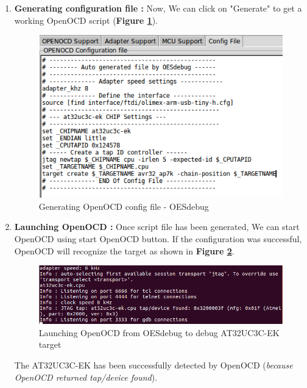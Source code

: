 \begin{enumerate}
\begin{enumerate}
		\item \textbf{Generating configuration file : } Now, We can click on "Generate" to get a working OpenOCD script (\textbf{Figure \ref{Generating OpenOCD config file - OESdebug}}).
		\begin{figure}[H]
			\centering
        	\includegraphics[scale=0.55]{img/solution/OESdebug-generatedScript.png}
        	\caption{Generating OpenOCD config file - OESdebug}
        	\label{Generating OpenOCD config file - OESdebug}
    	\end{figure}		
		
		
		\item \textbf{Launching OpenOCD : } Once script file has been generated, We can start OpenOCD using start OpenOCD button. If the configuration was successful, OpenOCD will recognize the target as shown in \textbf{Figure \ref{Launching OpenOCD from OESdebug on AT32UC3C-EK target}}.		
		\begin{figure}[H]
			\centering
        	\includegraphics[scale=0.60]{img/solution/at32uc3c0512c-found-openocd.png}
        	\caption{Launching OpenOCD from OESdebug to debug AT32UC3C-EK target}
        	\label{Launching OpenOCD from OESdebug on AT32UC3C-EK target}
    	\end{figure}	
	
		The AT32UC3C-EK has been successfully detected by OpenOCD (\textit{because OpenOCD returned \textit{tap/device found}}).
		

\end{enumerate}
\end{enumerate}
